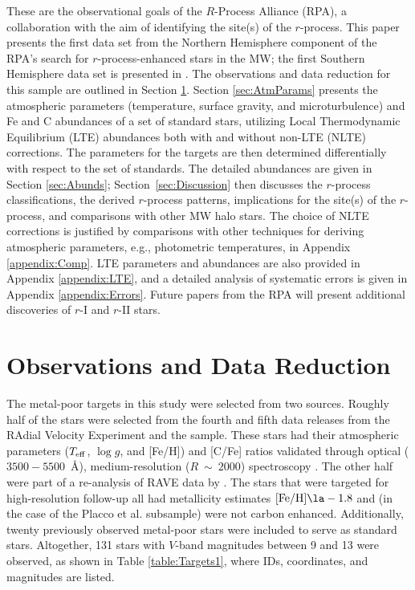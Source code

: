 \documentclass[preprint]{aastex61}
\begin{document}
These are the observational goals of the $R$-Process Alliance (RPA), a
collaboration with the aim of identifying the site(s) of the
$r$-process.  This paper presents the first data set from the Northern
Hemisphere component of the RPA's search for $r$-process-enhanced
stars in the MW; the first Southern Hemisphere data set is presented
in \citet{Hansen2018}.  The observations and data reduction for this
sample are outlined in Section \ref{sec:Observations}.  Section
\ref{sec:AtmParams} presents the atmospheric parameters (temperature,
surface gravity, and microturbulence) and Fe and C abundances of a set
of standard stars, utilizing Local Thermodynamic Equilibrium (LTE)
 abundances both with and without non-LTE (NLTE)
corrections.  The parameters for the targets are then determined
differentially with respect to the set of standards.  The detailed
abundances are given in Section \ref{sec:Abunds};
Section~\ref{sec:Discussion} then discusses the $r$-process
classifications, the derived $r$-process patterns, implications for
the site(s) of the $r$-process, and comparisons with other MW halo
stars.  The choice of NLTE corrections is justified by comparisons
with other techniques for deriving atmospheric parameters, e.g.,
photometric temperatures, in Appendix \ref{appendix:Comp}.  LTE
parameters and abundances are also provided in Appendix
\ref{appendix:LTE}, and a detailed analysis of systematic errors is
given in Appendix \ref{appendix:Errors}.  Future papers from the RPA
will present additional discoveries of $r$-I and $r$-II stars.


\section{Observations and Data Reduction}\label{sec:Observations}
The metal-poor targets in this study were selected from two sources.  
Roughly half of the stars were selected from the fourth
\citep{RAVEDR4ref} and fifth \citep{RAVEDR5ref} data releases from the
RAdial Velocity Experiment \citep[RAVE]{RAVEref} and the
\citet{BaBref} sample.  These stars had their atmospheric parameters
($T_{\rm{eff}}$, $\log g$, and [Fe/H]) and [C/Fe] ratios validated
through optical ($3500-5500$~\AA), medium-resolution ($R~\sim~2000$)
spectroscopy \citep{Placco2018}.  The other half were part of a
re-analysis of RAVE data by \citet{Matijevic2017}.  The stars that
were targeted for high-resolution follow-up all had metallicity
estimates $[\rm{Fe/H}] \la -1.8$ and (in the case of the Placco et
al. subsample) were not carbon enhanced. Additionally, twenty
previously observed metal-poor stars were included to serve as
standard stars. Altogether, 131 stars with $V$-band magnitudes between
9 and 13 were observed, as shown in Table \ref{table:Targets1}, where
IDs, coordinates, and magnitudes are listed.
\end{document}

